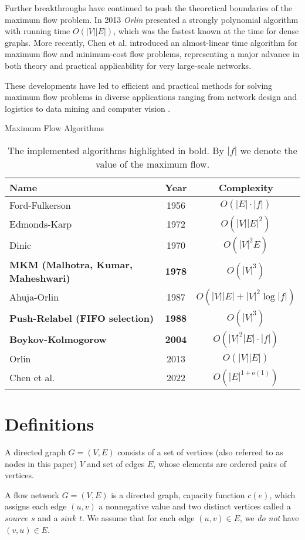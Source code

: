 Further breakthroughs have continued to push the theoretical boundaries of the maximum flow problem. In 2013 \emph{Orlin} \cite{orlin} presented a strongly polynomial algorithm with running time $O(|V||E|)$, which was the fastest known at the time for dense graphs. More recently, Chen et al. \cite{chen2022} introduced an almost-linear time algorithm for maximum flow and minimum-cost flow problems, representing a major advance in both theory and practical applicability for very large-scale networks.

These developments have led to efficient and practical methods for solving maximum flow problems in diverse applications ranging from network design \cite{design} and logistics to  data mining \cite{datamining} and computer vision \cite{BK}.

\begin{table}[H]
\centering
\caption{Maximum Flow Algorithms}
\begin{tabular}{l c c}
\toprule
\textbf{Name} & \textbf{Year} & \textbf{Complexity} \\
\midrule
Ford-Fulkerson & 1956 & $O(|E| \cdot |f|)$  \\
Edmonds-Karp & 1972 & $O(|V||E|^2)$ \\
Dinic & 1970 & $O(|V|^2E)$ \\
\textbf{MKM (Malhotra, Kumar, Maheshwari)} & \textbf{1978} & \textbf{$O(|V|^3)$}\\
Ahuja-Orlin & 1987 & $O(|V||E| + |V|^2 \log |f|)$ \\
\textbf{Push-Relabel (FIFO selection)} & \textbf{1988} & \textbf{$O(|V|^3)$} \\
\textbf{Boykov-Kolmogorow} & \textbf{2004} & \textbf{$O(|V|^2|E| \cdot |f|)$} \\
Orlin & 2013 & $O(|V||E|)$ \\
Chen et al. & 2022 & $O(|E|^{1+o(1)})$ \\
\bottomrule
\end{tabular}
\caption*{The implemented algorithms highlighted in bold. By $|f|$ we denote the value of the maximum flow.}
\end{table}

\section{Definitions}

\begin{defn}
A directed graph $G=(V,E)$ consists of a set of vertices (also referred to as nodes in this paper) $V$ and set of edges $E$, whose elements are ordered pairs of vertices. 
\end{defn}
\begin{defn}
A flow network $G = (V,E)$ is a directed graph, capacity function $c(e)$, which assigns each edge $(u,v)$ a nonnegative value and two distinct vertices called a $source$ $s$ and a $sink$ $t$. We assume that for each edge $(u,v) \in E$, we \emph{do not} have $(v,u) \in E$. 
\end{defn}

